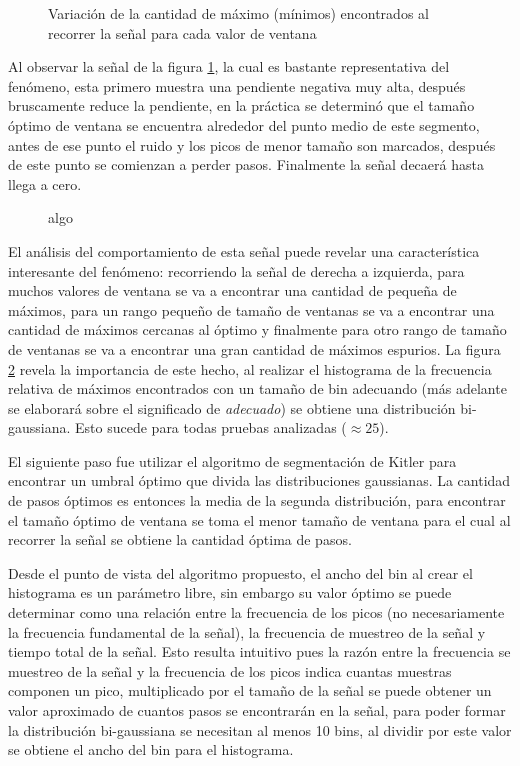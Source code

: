 \begin{figure}
    \centering
    
    \caption{Variación de la cantidad de máximo (mínimos) encontrados al recorrer la señal para cada valor de ventana}
    \label{fig:ventana}
\end{figure}

Al observar la señal de la figura \ref{fig:ventana}, la cual es bastante representativa del fenómeno, esta primero muestra una pendiente negativa muy alta, después bruscamente reduce la pendiente, en la práctica se determinó que el tamaño óptimo de ventana se encuentra alrededor del punto medio de este segmento, antes de ese punto el ruido y los picos de menor tamaño son marcados, después de este punto se comienzan a perder pasos. Finalmente la señal decaerá hasta llega a cero.

\begin{figure}
    \centering
    
    \caption{algo}
    \label{fig:histograma}
\end{figure}

El análisis del comportamiento de esta señal puede revelar una característica interesante del fenómeno: recorriendo la señal de derecha a izquierda, para muchos valores de ventana se va a encontrar una cantidad de pequeña de máximos, para un rango pequeño de tamaño de ventanas se va a encontrar una cantidad de máximos cercanas al óptimo y finalmente para otro rango de tamaño de ventanas se va a encontrar una gran cantidad de máximos espurios. La figura \ref{fig:histograma} revela la importancia de este hecho, al realizar el histograma de la frecuencia relativa de máximos encontrados con un tamaño de bin adecuando (más adelante se elaborará sobre el significado de \emph{adecuado}) se obtiene una distribución bi-gaussiana. Esto sucede para todas pruebas analizadas ($\approx 25$). 

El siguiente paso fue utilizar el algoritmo de segmentación de Kitler para encontrar un umbral óptimo que divida las distribuciones gaussianas. La cantidad de pasos óptimos es entonces la media de la segunda distribución, para encontrar el tamaño óptimo de ventana se toma el menor tamaño de ventana para el cual al recorrer la señal se obtiene la cantidad óptima de pasos. 

Desde el punto de vista del algoritmo propuesto, el ancho del bin al crear el histograma es un parámetro libre, sin embargo su valor óptimo se puede determinar como una relación entre la frecuencia de los picos (no necesariamente la frecuencia fundamental de la señal), la frecuencia de muestreo de la señal y tiempo total de la señal. Esto resulta intuitivo pues la razón entre la frecuencia se muestreo de la señal y la frecuencia de los picos indica cuantas muestras componen un pico, multiplicado por el tamaño de la señal se puede obtener un valor aproximado de cuantos pasos se encontrarán en la señal, para poder formar la distribución bi-gaussiana se necesitan al menos 10 bins, al dividir por este valor se obtiene el ancho del bin para el histograma.

